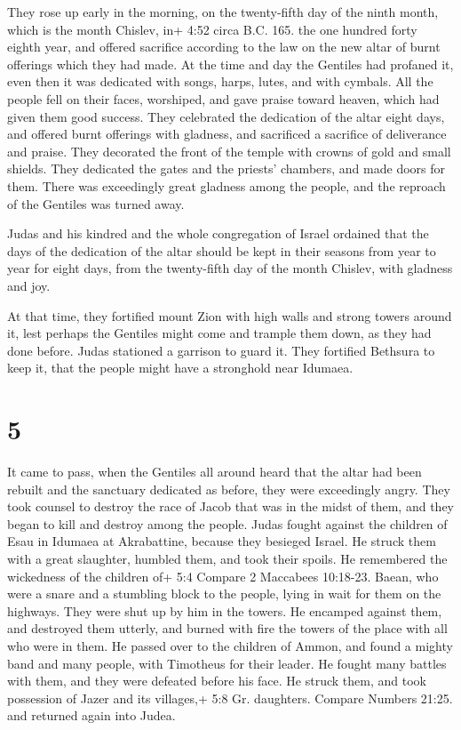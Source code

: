  They rose up early in the morning, on the twenty-fifth day
of the ninth month, which is the month Chislev, in+ 4:52 circa B.C. 165.
the one hundred forty eighth year,  and offered sacrifice
according to the law on the new altar of burnt offerings which they had
made.  At the time and day the Gentiles had profaned it,
even then it was dedicated with songs, harps, lutes, and with cymbals.
 All the people fell on their faces, worshiped, and gave
praise toward heaven, which had given them good success. 
They celebrated the dedication of the altar eight days, and offered
burnt offerings with gladness, and sacrificed a sacrifice of deliverance
and praise.  They decorated the front of the temple with
crowns of gold and small shields. They dedicated the gates and the
priests' chambers, and made doors for them.  There was
exceedingly great gladness among the people, and the reproach of the
Gentiles was turned away.

 Judas and his kindred and the whole congregation of Israel
ordained that the days of the dedication of the altar should be kept in
their seasons from year to year for eight days, from the twenty-fifth
day of the month Chislev, with gladness and joy.

 At that time, they fortified mount Zion with high walls
and strong towers around it, lest perhaps the Gentiles might come and
trample them down, as they had done before.  Judas
stationed a garrison to guard it. They fortified Bethsura to keep it,
that the people might have a stronghold near Idumaea.

\hypertarget{section-4}{%
\section{5}\label{section-4}}

 It came to pass, when the Gentiles all around heard that
the altar had been rebuilt and the sanctuary dedicated as before, they
were exceedingly angry.  They took counsel to destroy the
race of Jacob that was in the midst of them, and they began to kill and
destroy among the people.  Judas fought against the children
of Esau in Idumaea at Akrabattine, because they besieged Israel. He
struck them with a great slaughter, humbled them, and took their spoils.
 He remembered the wickedness of the children of+ 5:4
Compare 2 Maccabees 10:18-23. Baean, who were a snare and a stumbling
block to the people, lying in wait for them on the highways.
 They were shut up by him in the towers. He encamped against
them, and destroyed them utterly, and burned with fire the towers of the
place with all who were in them.  He passed over to the
children of Ammon, and found a mighty band and many people, with
Timotheus for their leader.  He fought many battles with
them, and they were defeated before his face. He struck them,
 and took possession of Jazer and its villages,+ 5:8 Gr.
daughters. Compare Numbers 21:25. and returned again into Judea.

